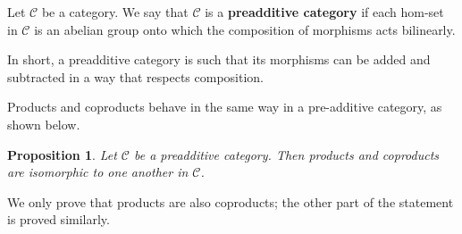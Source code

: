 \documentclass{beamer}
\newtheorem{proposition}{Proposition}
\begin{document}
\begin{frame}
    \begin{definition}
        Let $\mathcal{C}$ be a category. We say that $\mathcal{C}$
        is a \textbf{preadditive category} if each hom-set in
        $\mathcal{C}$ is an abelian group onto which the composition of
        morphisms acts bilinearly.
    \end{definition}

    In short, a preadditive category is such that its morphisms can
    be added and subtracted in a way that respects composition.
\end{frame}

\begin{frame}
    Products and coproducts behave in the same way in a
    pre-additive category, as shown below. \smallskip

    \begin{proposition}
        Let $\mathcal{C}$ be a preadditive category. Then
        products and coproducts are isomorphic to one
        another in $\mathcal{C}$.
    \end{proposition}

    We only prove that products are also coproducts; the other part of
    the statement is proved similarly.
\end{frame}
\end{document}
